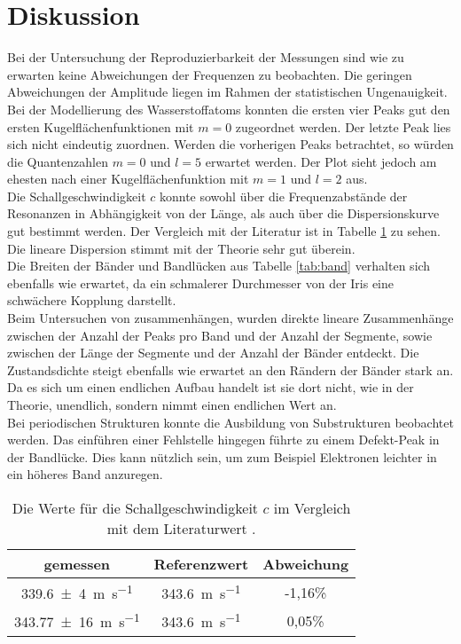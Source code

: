 
\section{Diskussion}
\label{sec:Diskussion}

Bei der Untersuchung der Reproduzierbarkeit der Messungen sind wie zu erwarten keine Abweichungen der Frequenzen zu beobachten. Die geringen Abweichungen der Amplitude liegen im Rahmen der statistischen Ungenauigkeit.\\
Bei der Modellierung des Wasserstoffatoms konnten die ersten vier Peaks gut den ersten Kugelflächenfunktionen mit $m=0$ zugeordnet werden. Der letzte Peak lies sich nicht eindeutig zuordnen. Werden die vorherigen Peaks betrachtet, so würden die Quantenzahlen $m=0$ und $l=5$ erwartet werden. Der Plot sieht jedoch am ehesten nach einer Kugelflächenfunktion mit $m=1$ und $l=2$ aus. \\
Die Schallgeschwindigkeit $c$ konnte sowohl über die Frequenzabstände der Resonanzen in Abhängigkeit von der Länge, als auch über die Dispersionskurve gut bestimmt werden. Der Vergleich mit der Literatur ist in Tabelle \ref{tab:Diskussion} zu sehen. Die lineare Dispersion stimmt mit der Theorie sehr gut überein.\\
Die Breiten der Bänder und Bandlücken aus Tabelle \ref{tab:band} verhalten sich ebenfalls wie erwartet, da ein schmalerer Durchmesser von der Iris eine schwächere Kopplung darstellt.\\
Beim Untersuchen von zusammenhängen, wurden direkte lineare Zusammenhänge zwischen der Anzahl der Peaks pro Band und der Anzahl der Segmente, sowie zwischen der Länge der Segmente und der Anzahl der Bänder entdeckt. Die Zustandsdichte steigt ebenfalls wie erwartet an den Rändern der Bänder stark an. Da es sich um einen endlichen Aufbau handelt ist sie dort nicht, wie in der Theorie, unendlich, sondern nimmt einen endlichen Wert an.\\
Bei periodischen Strukturen konnte die Ausbildung von Substrukturen beobachtet werden. Das einführen einer Fehlstelle hingegen führte zu einem Defekt-Peak in der Bandlücke. Dies kann nützlich sein, um zum Beispiel Elektronen leichter in ein höheres Band anzuregen.

\begin{table}
\centering
	\caption{Die Werte für die Schallgeschwindigkeit $c$ im Vergleich mit dem Literaturwert \cite{cLuft}.}
	\label{tab:Diskussion}
	\begin{tabular}{ccc}
		\toprule
		{gemessen}&{Referenzwert\cite{DipolW}}&{Abweichung} \\
		\midrule
		\SI{339,6(4)}{\metre\per\second}   & \SI{343,6}{\metre\per\second} & -1,16\%\\
		\SI{343,77(16)}{\metre\per\second} & \SI{343,6}{\metre\per\second} & 0,05\%\\
		\bottomrule
	\end{tabular}
\end{table}